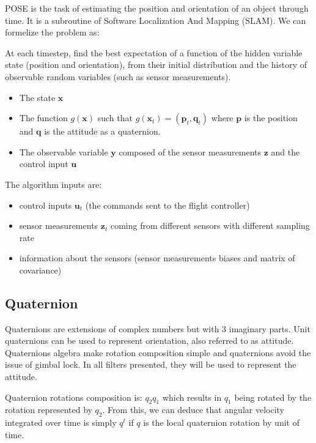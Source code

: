 \documentclass[]{article}
\providecommand{\tightlist}{%
  \setlength{\itemsep}{0pt}\setlength{\parskip}{0pt}}
\begin{document}
POSE is the task of estimating the position and orientation of an object
through time. It is a subroutine of Software Localization And Mapping
(SLAM). We can formelize the problem as:

At each timestep, find the best expectation of a function of the hidden
variable state (position and orientation), from their initial
distribution and the history of observable random variables (such as
sensor measurements).

\begin{itemize}
\tightlist
\item
  The state \(\mathbf{x}\)
\item
  The function \(g(\mathbf{x})\) such that
  \(g(\mathbf{x}_t) = (\mathbf{p}_t, \mathbf{q}_t)\) where
  \(\mathbf{p}\) is the position and \(\mathbf{q}\) is the attitude as a
  quaternion.
\item
  The observable variable \(\mathbf{y}\) composed of the sensor
  measurements \(\mathbf{z}\) and the control input \(\mathbf{u}\)
\end{itemize}

The algorithm inputs are:

\begin{itemize}
\tightlist
\item
  control inputs \(\mathbf{u}_t\) (the commands sent to the flight
  controller)
\item
  sensor measurements \(\mathbf{z}_t\) coming from different sensors
  with different sampling rate
\item
  information about the sensors (sensor measurements biases and matrix
  of covariance)
\end{itemize}

\subsection{Quaternion}\label{quaternion}

Quaternions are extensions of complex numbers but with 3 imaginary
parts. Unit quaternions can be used to represent orientation, also
referred to as attitude. Quaternions algebra make rotation composition
simple and quaternions avoid the issue of gimbal lock. In all filters
presented, they will be used to represent the attitude.

Quaternion rotations composition is: \(q_2 q_1\) which results in
\(q_1\) being rotated by the rotation represented by \(q_2\). From this,
we can deduce that angular velocity integrated over time is simply
\(q^t\) if \(q\) is the local quaternion rotation by unit of time.
\end{document}
